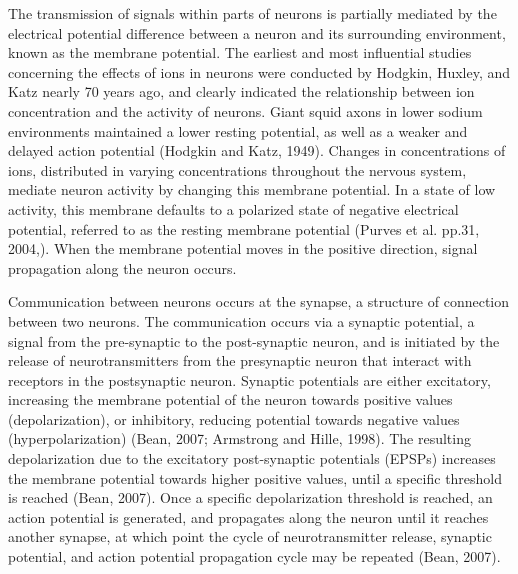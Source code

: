 \documentclass[11pt,titlepage]{article}
\begin{document}
The transmission of signals within parts of neurons is partially mediated by the electrical potential difference between a neuron and its surrounding environment, known as the membrane potential. The earliest and most influential studies concerning the effects of ions in neurons were conducted by Hodgkin, Huxley, and Katz nearly 70 years ago, and clearly indicated the relationship between ion concentration and the activity of neurons. Giant squid axons in lower sodium environments maintained a lower resting potential, as well as a weaker and delayed action potential (Hodgkin and Katz, 1949). 
Changes in concentrations of ions, distributed in varying concentrations throughout the nervous system, mediate neuron activity by changing this membrane potential. In a state of low activity, this membrane defaults to a polarized state of negative electrical potential, referred to as the resting membrane potential (Purves et al. pp.31, 2004,). When the membrane potential moves in the positive direction, signal propagation along the neuron occurs.\par

Communication between neurons occurs at the synapse, a structure of connection between two neurons. The communication occurs via a synaptic potential, a signal from the pre-synaptic to the post-synaptic neuron, and is initiated by the release of neurotransmitters from the presynaptic neuron that interact with receptors in the postsynaptic neuron. Synaptic potentials are either excitatory, increasing the membrane potential of the neuron towards positive values (depolarization), or inhibitory, reducing potential towards negative values (hyperpolarization) (Bean, 2007; Armstrong and Hille, 1998). The resulting depolarization due to the excitatory post-synaptic potentials (EPSPs) increases the membrane potential towards higher positive values, until a specific threshold is reached (Bean, 2007). Once a specific depolarization threshold is reached, an action potential is generated, and propagates along the neuron until it reaches another synapse, at which point the cycle of neurotransmitter release, synaptic potential, and action potential propagation cycle may be repeated (Bean, 2007).\par

\end{document}
